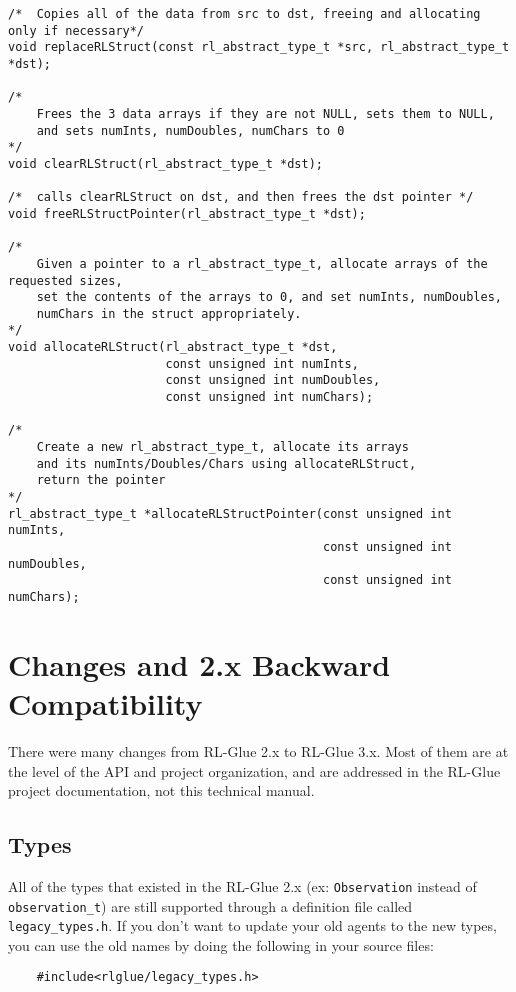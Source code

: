 \documentclass[11pt]{article}
\begin{document}
\begin{verbatim}
/*	Copies all of the data from src to dst, freeing and allocating only if necessary*/
void replaceRLStruct(const rl_abstract_type_t *src, rl_abstract_type_t *dst);

/*  
    Frees the 3 data arrays if they are not NULL, sets them to NULL, 
    and sets numInts, numDoubles, numChars to 0
*/
void clearRLStruct(rl_abstract_type_t *dst);

/*  calls clearRLStruct on dst, and then frees the dst pointer */
void freeRLStructPointer(rl_abstract_type_t *dst);

/*
    Given a pointer to a rl_abstract_type_t, allocate arrays of the requested sizes,
    set the contents of the arrays to 0, and set numInts, numDoubles,
    numChars in the struct appropriately.
*/
void allocateRLStruct(rl_abstract_type_t *dst, 
                      const unsigned int numInts,
                      const unsigned int numDoubles,
                      const unsigned int numChars);

/*
    Create a new rl_abstract_type_t, allocate its arrays 
    and its numInts/Doubles/Chars using allocateRLStruct, 
    return the pointer
*/
rl_abstract_type_t *allocateRLStructPointer(const unsigned int numInts,
                                            const unsigned int numDoubles,
                                            const unsigned int numChars);
\end{verbatim}



\section{Changes and 2.x Backward Compatibility}
There were many changes from RL-Glue 2.x to RL-Glue 3.x.  Most of them are at the level of the API and project organization, and are addressed in the RL-Glue 
project documentation, not this technical manual.

\subsection{Types}
All of the types that existed in the RL-Glue 2.x  (ex: \texttt{Observation} instead of \texttt{observation\_t}) are still supported through a definition file called 
\texttt{legacy\_types.h}.  If you don't want to update your old agents to the new types, you can use the old names by doing the following in your source files:
\begin{verbatim}
	#include<rlglue/legacy_types.h>
\end{verbatim}
\end{document}
